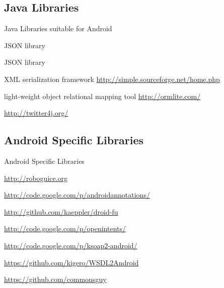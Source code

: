 \documentclass[aspectratio=169]{beamer}
\newcommand{\surl}[1] {{\tiny \url{#1}}}
\begin{document}
  \subsection{Java Libraries}

    \begin{frame}{Java Libraries suitable for Android}
      \begin{description}
        \item<1->[jackson] JSON library 
        \item<2->[gson] JSON library
        
        \item<3->[SimpleXML] XML serialization framework \surl{http://simple.sourceforge.net/home.php}

        \item<4->[ormlite] light-weight object relational mapping tool \surl{http://ormlite.com/}

        \item<5->[Twitter4J] \surl{http://twitter4j.org/}

        
      \end{description}
    \end{frame}

  \subsection{Android Specific Libraries}

    \begin{frame}{Android Specific Libraries}
      \begin{description}
        \item<1->[Roboguice] \surl{http://roboguice.org} 
        \item<2->[AndroidAnnotations] \surl{http://code.google.com/p/androidannotations/}
        \item<3->[DroidFu] \surl{http://github.com/kaeppler/droid-fu}
        \item<4->[OpenIntents] \surl{http://code.google.com/p/openintents/}
        \item<6->[ksoap2-android] \surl{http://code.google.com/p/ksoap2-android/}
        \item<7->[WSDL2Android] \surl{https://github.com/kigero/WSDL2Android}
        \item<8->[CommonsWare Android Components CWAC] \surl{https://github.com/commonsguy}
    \end{description}
    \end{frame}
  
\end{document}
